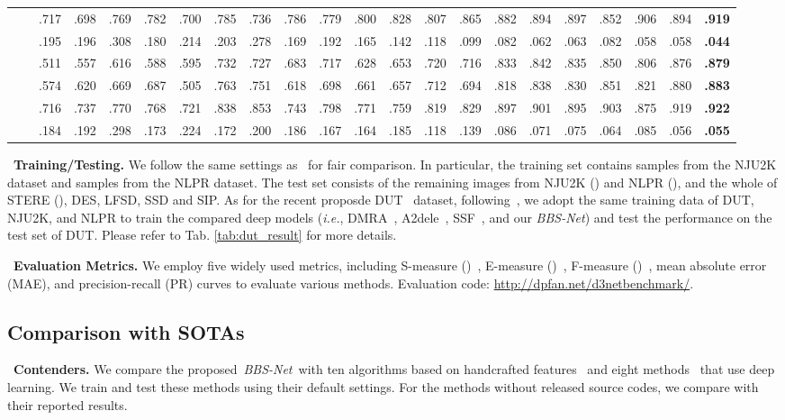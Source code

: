 \documentclass[journal]{IEEEtran}
\newcommand{\tabref}[1]{Tab. \ref{#1}}
\newcommand{\myPara}[1]{\vspace{10pt}\noindent~\textbf{#1} \quad}
\def\ie{\emph{i.e.}}
\def\ourmodel{\emph{BBS-Net}}
\begin{document}
\begin{table*}[t!]
\begin{tabular}{cr|cccccccccc|cccccccc|cc}
& 
		&.717&.698&.769&.782&.700&.785&.736&.786&.779&.800&.828&.807&.865&.882&.894&.897&.852&{.906}&{.894}&{\textbf{.919}}\\
		& 
		&.195&.196&.308&.180&.214&.203&.278&.169&.192&.165&.142&.118&.099&.082&.062&.063&.082&{.058}&.058&\textbf{{.044}}\\
		\hline
		\multicolumn{1}{c}{\multirow{4}{*}{\rotatebox{90}{SIP}}}
		& 
		&.511&.557&.616&.588&.595&.732&.727&.683&.717&.628&.653&.720&.716&.833&.842&.835&{.850}&.806&.876&\textbf{{.879}}\\
& 
		&.574&.620&.669&.687&.505&.763&.751&.618&.698&.661&.657&.712&.694&.818&.838&.830&{.851}&.821&.880&\textbf{{.883}}\\
& 
		&.716&.737&.770&.768&.721&.838&.853&.743&.798&.771&.759&.819&.829&.897&.901&.895&{.903}&.875&.919&\textbf{{.922}}\\
		& 
		&.184&.192&.298&.173&.224&.172&.200&.186&.167&.164&.185&.118&.139&.086&.071&.075&{.064}&.085&.056&\textbf{{.055}}\\	
		\bottomrule	
	\end{tabular}
\end{table*}
\myPara{\textbf{Training/Testing.}} We follow the same settings as~\cite{chen2018PCF,piao2019DMRA} for fair comparison. In particular, the training set contains  samples from the NJU2K dataset and  samples from the NLPR dataset.
The test set consists of the remaining images from NJU2K () and NLPR (), and the whole of STERE (), DES, LFSD, SSD and SIP.
As for the recent proposde DUT~\cite{piao2019DMRA} dataset, following~\cite{piao2019DMRA}, 
we adopt the same training data of DUT, NJU2K, and NLPR to train the compared deep models (\ie, DMRA~\cite{piao2019DMRA}, A2dele~\cite{piao2020a2dele}, SSF~\cite{zhang2020select}, and our \ourmodel) and test the performance on the test set of DUT. Please refer to \tabref{tab:dut_result} for more details.

\myPara{\textbf{Evaluation Metrics.}}
We employ five widely used metrics, including S-measure ()~\cite{Fan2017Smeasure},
E-measure ()~\cite{Fan2018Emeasure},
F-measure ()~\cite{Ach2009Fmeasure},
mean absolute error (MAE), and precision-recall (PR) curves to evaluate various methods. 
Evaluation code: \href{http://dpfan.net/d3netbenchmark/}{http://dpfan.net/d3netbenchmark/}.



\subsection{Comparison with SOTAs}\label{sec:compare_sota}
\myPara{\textbf{Contenders.}}\label{sec:contenders}
We compare the proposed~\ourmodel~with ten algorithms based on handcrafted features~\cite{cheng2014DESM,cong2016DCMC,feng2016LBE,guo2016SE,ju2014ACSD,liang2018CDB,peng2014LHM,ren2015GP,zhu2017CDCP,song2017MDSF}
and eight methods~\cite{chen2018PCF,chen2019TANet,chen2019MMCI,han2018CTMF,piao2019DMRA,qu2017DF,wang2019AFNet,zhao2019CPFP} that use deep learning.
We train and test these methods using their default settings.
For the methods without released source codes, we compare with their reported results.\par
\end{document}
